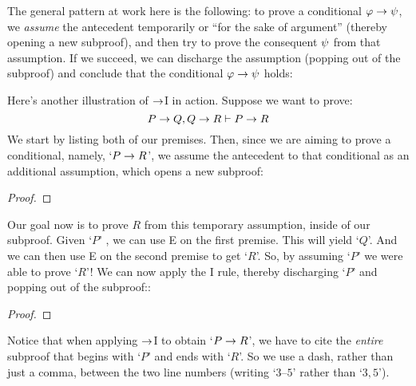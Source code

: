 The general pattern at work here is the following: to prove a conditional $\mathcal{\varphi} \rightarrow \mathcal{\psi}$, we \emph{assume} the antecedent \meta{\varphi} temporarily or ``for the sake of argument'' (thereby opening a new subproof), and then try to prove the consequent $\mathcal{\psi}$ from that assumption. If we succeed, we can discharge the assumption (popping out of the subproof) and conclude that the conditional $\mathcal{\varphi} \rightarrow \mathcal{\psi}$ holds:

Here's another illustration of $\rightarrow$I in action. Suppose we want to prove:
	$$P \rightarrow Q, Q \rightarrow R \vdash P \rightarrow R$$
We start by listing both of our premises. Then, since we are aiming to prove a conditional, namely, `$P \rightarrow R$', we assume the antecedent to that conditional as an additional assumption, which opens a new subproof:
\begin{proof}
	  
	  
	\open
		  
		\have[\ ]{}{\vdots}
	\close
\end{proof}
Our goal now is to prove $R$ from this temporary assumption, inside of our subproof.  Given `$P$' , we can use {\eif}E on the first premise. This will yield `$Q$'. And we can then use {\eif}E on the second premise to get `$R$'. So, by assuming `$P$' we were able to prove `$R$'!  We can now apply the {\eif}I rule, thereby discharging `$P$' and popping out of the subproof::\label{HSproof}
\begin{proof}
	  
	  
	\open
		 
	\close
\end{proof}
Notice that when applying $\rightarrow$I to obtain `$P \rightarrow R$', we have to cite the \emph{entire} subproof that begins with `$P$' and ends with `$R$'.  So we use a dash, rather than just a comma, between the two line numbers (writing `$3$--$5$' rather than `$3,5$').

